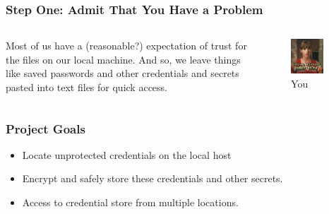\documentclass[aspectratio=169]{beamer}
\begin{document}
\begin{frame}
	\frametitle{Step One: Admit That You Have a Problem}

\begin{columns}

    Most of us have a (reasonable?) expectation of trust for the files on our local machine. And so, we leave things like saved passwords and other credentials and secrets pasted into text files for quick access.

	\begin{figure}
		\centering
		\includegraphics[width=0.77\textwidth]{../static/images/problem.jpg}
		\caption{You}
		\label{fig:question}
	\end{figure}

	\end{columns}


\end{frame}

\begin{frame}
	\frametitle{Project Goals}
    \begin{itemize}
    	\item Locate unprotected credentials on the local host
        \item Encrypt and safely store these credentials and other secrets.
        \item Access to credential store from multiple locations.
    \end{itemize}


\end{frame}
\end{document}
